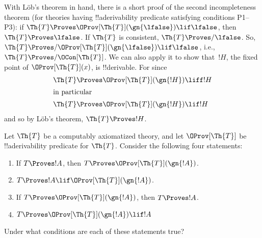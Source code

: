 \documentclass[../../../include/open-logic-section]{subfiles}
\begin{document}
With L\"ob's theorem in hand, there is a short proof of the second
incompleteness theorem (for theories having !!a{derivability} predicate
satisfying conditions P1--P3): if $\Th{T} \Proves
\OProv[\Th{T}](\gn{\lfalse}) \lif \lfalse$, then $\Th{T} \Proves \lfalse$.
If $\Th{T}$ is consistent, $\Th{T} \Proves/ \lfalse$. So, $\Th{T}
\Proves/ \OProv[\Th{T}](\gn{\lfalse}) \lif \lfalse$, i.e., $\Th{T} \Proves/
\OCon[\Th{T}]$.  We can also apply it to show that~$!H$, the fixed
point of $\OProv[\Th{T}](x)$, is !!{derivable}. For since
\begin{align*}
  \Th{T} & \Proves \OProv[\Th{T}](\gn{!H}) \liff !H\\
  \intertext{in particular}
    \Th{T} & \Proves \OProv[\Th{T}](\gn{!H}) \lif !H
\end{align*}
and so by L\"ob's theorem, $\Th{T} \Proves !H$.


\begin{prob}
Let $\Th{T}$ be a computably axiomatized theory, and
let $\OProv[\Th{T}]$ be !!a{derivability} predicate for $\Th{T}$. Consider the
following four statements:
\begin{enumerate}
\item If $T \Proves !A$, then $T \Proves \OProv[\Th{T}](\gn{!A})$.
\item $T \Proves !A \lif \OProv[\Th{T}](\gn{!A})$.
\item If $T \Proves \OProv[\Th{T}](\gn{!A})$, then $T \Proves !A$.
\item $T \Proves \OProv[\Th{T}](\gn{!A}) \lif !A$
\end{enumerate}
Under what conditions are each of these statements true?
\end{prob}
\end{document}
